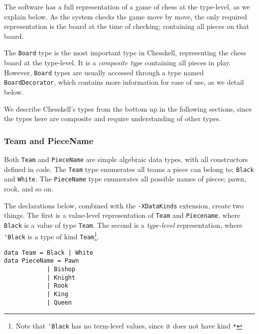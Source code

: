 \documentclass[12pt, a4paper, bibliography=totocnumbered]{scrartcl}
\begin{document}
The software has a full representation of a game of chess at the type-level, as we explain below. As the system checks the game move by move, the only required representation is the board at the time of checking; containing all pieces on that board.

The \lstinline{Board} type is the most important type in Chesskell, representing the chess board at the type-level. It is a \emph{composite type} containing all pieces in play. However, \lstinline{Board} types are usually accessed through a type named \lstinline{BoardDecorator}, which contains more information for ease of use, as we detail below.

We describe Chesskell's types from the bottom up in the following sections, since the types here are composite and require understanding of other types.

\subsubsection{Team and PieceName}

Both \lstinline{Team} and \lstinline{PieceName} are simple algebraic data types, with all constructors defined in code. The \lstinline{Team} type enumerates all teams a piece can belong to; \lstinline{Black} and \lstinline{White}. The \lstinline{PieceName} type enumerates all possible names of pieces; pawn, rook, and so on.

The declarations below, combined with the \lstinline{-XDataKinds} extension, create two things. The first is a value-level representation of \lstinline{Team} and \lstinline{Piecename}, where \lstinline{Black} is a value of type \lstinline{Team}. The second is a \emph{type-level} representation, where \lstinline{'Black} is a type of kind \lstinline{Team}\footnote{Note that \lstinline{'Black} has no term-level values, since it does not have kind \lstinline{*}}.


\begin{lstlisting}
data Team = Black | White
data PieceName = Pawn
            | Bishop
            | Knight
            | Rook
            | King
            | Queen
\end{lstlisting}
\end{document}
